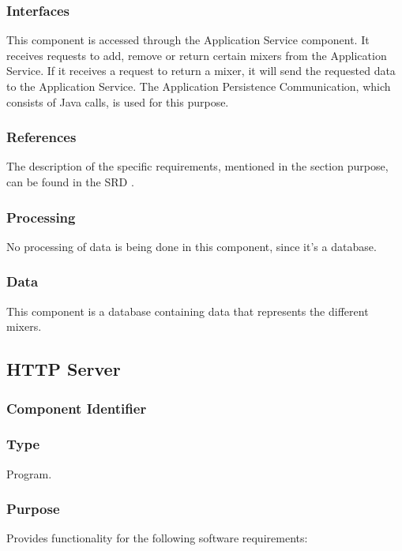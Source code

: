 \subsubsection*{Interfaces}
This component is accessed through the Application Service component. It receives requests to add, remove or return certain mixers from the Application Service. If it receives a request to return a mixer, it will send the requested data to the Application Service. The Application Persistence Communication, which consists of Java calls, is used for this purpose.

\subsubsection*{References}
The description of the specific requirements, mentioned in the section purpose, can be found in the SRD \cite{srd}.

\subsubsection*{Processing}
No processing of data is being done in this component, since it's a database.

\subsubsection*{Data}
This component is a database containing data that represents the different mixers.

\subsection{HTTP Server}
\label{subsec:httpserver}

\subsubsection*{Component Identifier}
\RTMSHS{}

\subsubsection*{Type}
Program.

\subsubsection*{Purpose}
Provides functionality for the following software requirements:

